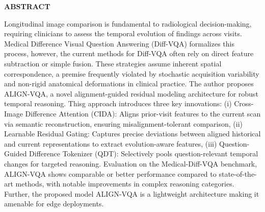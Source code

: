 {}

\begin{center}
    \large{\bf ABSTRACT}
\end{center}

Longitudinal image comparison is fundamental to radiological decision-making, requiring clinicians to assess the temporal evolution of findings across visits. Medical Difference Visual Question Answering (Diff-VQA) formalizes this process, however, the current methods for Diff-VQA often rely on direct feature subtraction or simple fusion. These strategies assume inherent spatial correspondence, a premise frequently violated by stochastic acquisition variability and non-rigid anatomical deformations in clinical practice. The author proposes ALIGN-VQA, a novel alignment-guided residual modeling architecture for robust temporal reasoning. Thisg approach introduces three key innovations: (i) Cross-Image Difference Attention (CIDA): Aligns prior-visit features to the current scan via semantic reconstruction, ensuring misalignment-tolerant comparison, (ii) Learnable Residual Gating: Captures precise deviations between aligned historical and current representations to extract evolution-aware features, (iii) Question-Guided Difference Tokenizer (QDT): Selectively pools question-relevant temporal changes for targeted reasoning. Evaluation on the Medical-Diff-VQA benchmark, ALIGN-VQA shows comparable or better performance compared to state-of-the-art methods, with notable improvements in complex reasoning categories. Further, the proposed model ALIGN-VQA is a lightweight architecture making it amenable for edge deployments.
